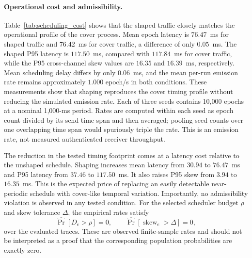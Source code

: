 \documentclass[journal]{IEEEtran}
\theoremstyle{definition}
\theoremstyle{game}
\begin{document}
\paragraph{Operational cost and admissibility.}
Table~\ref{tab:scheduling_cost} shows that the shaped traffic closely
matches the operational profile of the cover process. Mean epoch
latency is $76.47$~ms for shaped traffic and $76.42$~ms for cover
traffic, a difference of only $0.05$~ms. The shaped P95 latency is
$117.50$~ms, compared with $117.84$~ms for cover traffic, while the
P95 cross-channel skew values are $16.35$ and $16.39$~ms,
respectively. Mean scheduling delay differs by only $0.06$~ms, and
the mean per-run emission rate remains approximately $1.000$ epoch/s
in both conditions. These
measurements show that shaping reproduces the cover timing profile
without reducing the simulated emission rate. Each of three seeds
contains 10,000 epochs at a nominal 1,000-ms period. Rates are computed
within each seed as epoch count divided by its send-time span and then
averaged; pooling seed counts over one overlapping time span would
spuriously triple the rate. This is an emission rate, not measured
authenticated receiver throughput.

The reduction in the tested timing footprint comes at a latency cost
relative to the unshaped schedule. Shaping increases mean latency from $30.94$ to
$76.47$~ms and P95 latency from $37.46$ to $117.50$~ms. It also
raises P95 skew from $3.94$ to $16.35$~ms. This is the expected
price of replacing an easily detectable near-periodic schedule with
cover-like temporal variation. Importantly, no admissibility violation
is observed in any tested condition. For the selected scheduler budget
$\rho$ and skew tolerance $\Delta$, the empirical rates satisfy
\begin{equation}
\widehat{\Pr}[D_e>\rho]=0,
\qquad
\widehat{\Pr}
\!\left[
\operatorname{skew}_e>\Delta
\right]
=0,
\label{eq:supp_sched_admissibility}
\end{equation}
over the evaluated traces. These are observed finite-sample rates and
should not be interpreted as a proof that the corresponding population
probabilities are exactly zero.
\end{document}
